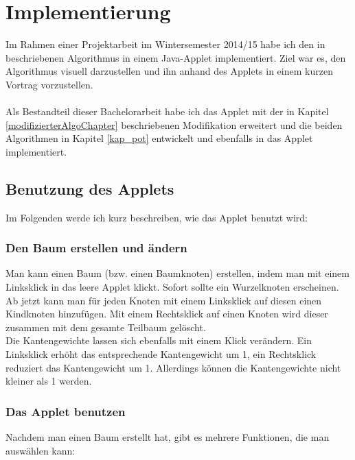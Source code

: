 \section{Implementierung}\label{kap_implementierung}

Im Rahmen einer Projektarbeit im Wintersemester 2014/15 habe ich den in \cite{cima_paper} beschriebenen Algorithmus in einem Java-Applet implementiert. Ziel war es, den Algorithmus visuell darzustellen und ihn anhand des Applets in einem kurzen Vortrag vorzustellen.
\\
\\
Als Bestandteil dieser Bachelorarbeit habe ich das Applet mit der in Kapitel \ref{modifizierterAlgoChapter} beschriebenen Modifikation erweitert und die beiden Algorithmen in Kapitel \ref{kap_pot} entwickelt und ebenfalls in das Applet implementiert.


\subsection{Benutzung des Applets}

Im Folgenden werde ich kurz beschreiben, wie das Applet benutzt wird:

\subsubsection*{Den Baum erstellen und ändern}

Man kann einen Baum (bzw. einen Baumknoten) erstellen, indem man mit einem Linksklick in das leere Applet klickt. Sofort sollte ein Wurzelknoten erscheinen.\\
Ab jetzt kann man für jeden Knoten mit einem Linksklick auf diesen einen Kindknoten hinzufügen. Mit einem Rechtsklick auf einen Knoten wird dieser zusammen mit dem gesamte Teilbaum gelöscht.\\
Die Kantengewichte lassen sich ebenfalls mit einem Klick verändern. Ein Linksklick erhöht das entsprechende Kantengewicht um 1, ein Rechtsklick reduziert das Kantengewicht um 1. Allerdings können die Kantengewichte nicht kleiner als 1 werden.


\subsubsection*{Das Applet benutzen}

Nachdem man einen Baum erstellt hat, gibt es mehrere Funktionen, die man auswählen kann:\\

